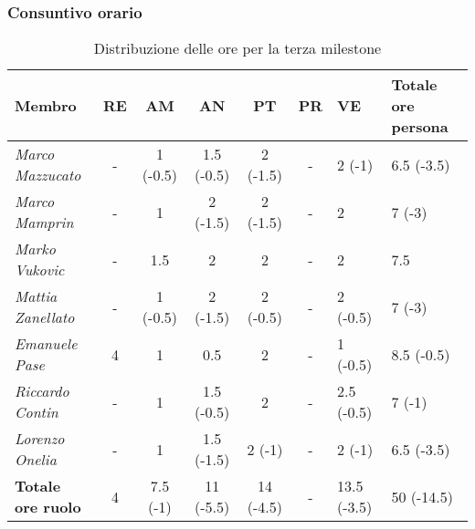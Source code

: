 \subsubsection{Consuntivo orario}
\begin{table}[H]
    \centering
    \begin{tabular}{|L{2cm}|c|c|c|c|c|C{1.5cm}|C{2cm}|}
    \hline
    \textbf{Membro} & \textbf{RE} & \textbf{AM} & \textbf{AN} & \textbf{PT} & \textbf{PR} & \textbf{VE} & \textbf{Totale ore persona} \\ \hline
    \textit{Marco Mazzucato}  & -    & 1 (-0.5)     & 1.5 (-0.5)  & 2 (-1.5)   & - & 2 (-1)        & 6.5 (-3.5)       \\ \hline
    \textit{Marco Mamprin}    & -    & 1            & 2 (-1.5)    & 2 (-1.5)   & - & 2             & 7 (-3)           \\ \hline
    \textit{Marko Vukovic}    & -    & 1.5          & 2           & 2          & - & 2             & 7.5              \\ \hline
    \textit{Mattia Zanellato} & -    & 1 (-0.5)     & 2 (-1.5)    & 2 (-0.5)   & - & 2 (-0.5)      & 7 (-3)           \\ \hline
    \textit{Emanuele Pase}    & 4    & 1            & 0.5         & 2          & - & 1 (-0.5)      & 8.5 (-0.5)       \\ \hline
    \textit{Riccardo Contin}  & -    & 1            & 1.5 (-0.5)  & 2          & - & 2.5 (-0.5)    & 7 (-1)           \\ \hline
    \textit{Lorenzo Onelia}   & -    & 1            & 1.5 (-1.5)  & 2 (-1)     & - & 2 (-1)        & 6.5 (-3.5)       \\ \hline
    \textbf{Totale ore ruolo} & 4    & 7.5 (-1)     & 11 (-5.5)   & 14 (-4.5)  & - & 13.5 (-3.5)   & 50 (-14.5)       \\ \hline
    \end{tabular}
  \caption{Distribuzione delle ore per la terza milestone}
\end{table}

